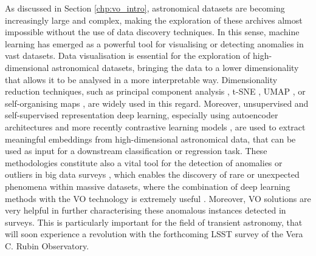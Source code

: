 As discussed in Section \ref{chp:vo_intro}, astronomical datasets are becoming increasingly large and complex, making the exploration of these archives almost impossible without the use of data discovery techniques. In this sense, machine learning has emerged as a powerful tool for visualising or detecting anomalies in vast datasets. Data visualisation is essential for the exploration of high-dimensional astronomical datasets, bringing the data to a lower dimensionality that allows it to be analysed in a more interpretable way. Dimensionality reduction techniques, such as principal component analysis \citep{hotelling:33}, t-SNE \citep{vandermaaten08}, UMAP \citep{McInnes2018}, or self-organising maps \citep[Kohonen networks; ][]{kohonen1982}, are widely used in this regard. Moreover, unsupervised and self-supervised representation deep learning, especially using autoencoder architectures \citep{serra1993} and more recently contrastive learning models \citep{chen2020}, are used to extract meaningful embeddings from high-dimensional astronomical data, that can be used as input for a downstream classification or regression task. These methodologies constitute also a vital tool for the detection of anomalies or outliers in big data surveys \citep{chalapathy2019}, which enables the discovery of rare or unexpected phenomena within massive datasets, where the combination of deep learning methods with the VO technology is extremely useful \citep{skoda2020}. Moreover, VO solutions are very helpful in further characterising these anomalous instances detected in surveys. This is particularly important for the field of transient astronomy, that will soon experience a revolution with the forthcoming LSST survey \citep{li2022} of the Vera C. Rubin Observatory.

